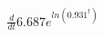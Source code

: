 \documentclass[preview]{standalone}
\begin{document}
\begin{align*}
\frac{d}{dt}6.687e^{ln(0.931^t)}
\end{align*}
\end{document}
